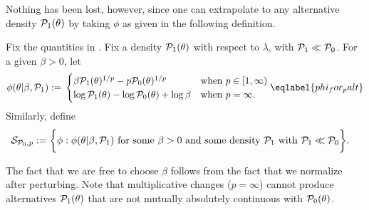 Nothing has been lost, however, since one can extrapolate to any alternative
density $\mathcal{P}_{1}(\theta)$ by taking $\phi$ as given in the following definition.


\begin{defn}
%
Fix the quantities in .  Fix a density $\mathcal{P}_{1}(\theta)$
with respect to $\lambda$, with $\mathcal{P}_{1} \ll \mathcal{P}_{0}$. For a given $\beta > 0$, let
%
\begin{align}
%
\phi(\theta | \beta, \palt) :={}
\begin{cases}
\beta \palt(\theta)^{1/p} - p \pbase(\theta)^{1/p}
    & \textrm{when }p \in [1, \infty) \\
\log \palt(\theta) - \log \pbase(\theta) + \log \beta
    & \textrm{when }p = \infty.
\end{cases} \eqlabel{phi_for_palt}
%
\end{align}
%
Similarly, define
%
\begin{align*}
%
\pertset := \bigg\{&
    \phi:  \phi(\theta | \beta, \palt) %
    \textrm{ for some }\beta > 0\textrm{ and some density }\palt
    \textrm{ with } \palt \ll \pbase
\bigg\}.
%
\end{align*}
%
\end{defn}

The fact that we are free to choose $\beta$ follows from the fact that we
normalize after perturbing.  Note that multiplicative changes ($p=\infty$)
cannot produce alternatives $\mathcal{P}_{1}(\theta)$ that are not mutually absolutely
continuous with $\mathcal{P}_{0}(\theta)$.



